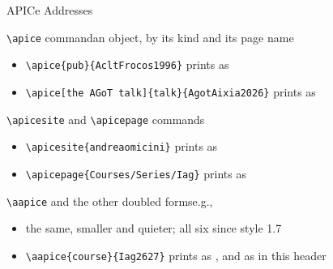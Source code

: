 \documentclass[presentation,bologna,apice]{beamer}\mode<presentation>{\usetheme{AMSUniBo}}
\begin{document}
\begin{frame}[c,fragile]{APICe Addresses}
%
\begin{block}{\texttt{\textbackslash{}apice} command\textemdash{}an object, by its kind and its page name}
\begin{itemize}
	\item[e.g.] \verb|| prints as \apice{pub}{AcltFrocos1996}
	\item[e.g.] \verb|| prints as \apice[the AGoT talk]{talk}{AgotAixia2026}
\end{itemize}
\end{block}
%
\begin{block}{\texttt{\textbackslash{}apicesite} and \texttt{\textbackslash{}apicepage} commands}
\begin{itemize}
	\item[e.g.] \verb|| prints as \apicesite{andreaomicini}
	\item[e.g.] \verb|| prints as \apicepage{Courses/Series/Iag}
\end{itemize}
\end{block}
%
\begin{block}{\texttt{\textbackslash{}aapice} and the other doubled forms\textemdash{}e.g., }
\begin{itemize}
	\item the same, smaller and quieter; all six since style 1.7
	\item[e.g.] \verb|\aapice{course}{Iag2627}| prints as , and as in this header
\end{itemize}
\end{block}
%
\end{frame}
\end{document}
